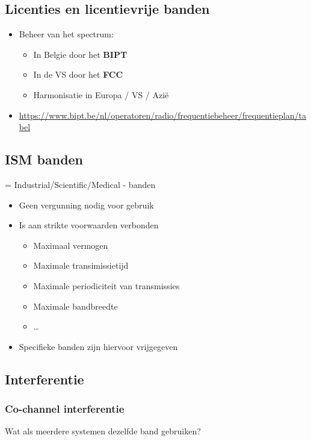 \documentclass{article}
\newcommand{\bold}[1]{\textbf{#1}}
\begin{document}
\subsection{Licenties en licentievrije banden}
\begin{itemize}
    \item Beheer van het spectrum:
    \begin{itemize}
        \item In Belgie door het \bold{BIPT}
        \item In de VS door het \bold{FCC}
        \item Harmonisatie in Europa / VS / Azië
    \end{itemize}
    \item \url{https://www.bipt.be/nl/operatoren/radio/frequentiebeheer/frequentieplan/tabel}
\end{itemize}

\subsection{ISM banden}
= Industrial/Scientific/Medical - banden
\begin{itemize}
    \item Geen vergunning nodig voor gebruik
    \item Is aan strikte voorwaarden verbonden
    \begin{itemize}
        \item Maximaal vermogen
        \item Maximale transimissietijd
        \item Maximale periodiciteit van transmissies
        \item Maximale bandbreedte
        \item \dots
    \end{itemize}
    \item Specifieke banden zijn hiervoor vrijgegeven
\end{itemize}

\subsection{Interferentie}

\subsubsection{Co-channel interferentie}
Wat als meerdere systemen dezelfde band gebruiken?
\end{document}
